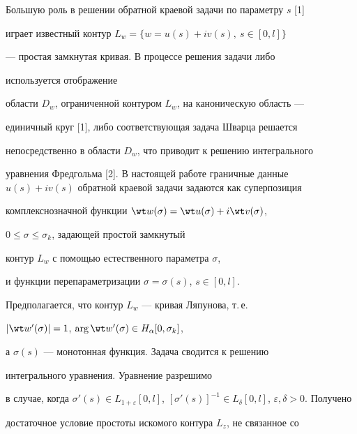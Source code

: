 

\maketitle


\label{begin}











Большую роль в решении обратной краевой задачи по параметру $s$ [1]


играет известный контур $L_w = \{w = u(s) + i v(s),\ s \in [0,l]\}$


--- простая замкнутая кривая. В процессе решения задачи либо


используется отображение


области $D_w$, ограниченной контуром $L_w$, на каноническую область ---


единичный круг [1], либо соответствующая задача Шварца решается


непосредственно в области $D_w$, что приводит к решению интегрального


уравнения Фредгольма [2]. В настоящей работе граничные данные $u(s) +


i v(s)$ обратной краевой задачи задаются как суперпозиция


комплекснозначной функции $\wt w(\sigma) = \wt u(\sigma) + i \wt v(\sigma)$,


$0 \leq \sigma \leq \sigma_k$, задающей простой замкнутый


контур $L_w$ с помощью естественного параметра $\sigma$,


и функции перепараметризации $\sigma = \sigma(s)$, $s \in [0,l]$.


Предполагается, что контур $L_w$ --- кривая Ляпунова, т.\,е.


$|\wt w'(\sigma)| = 1$, $\arg \wt w'(\sigma) \in H_{\alpha}[0,\sigma_k]$,


а $\sigma(s)$ --- монотонная функция. Задача сводится к решению


интегрального уравнения. Уравнение разрешимо


в случае, когда $\sigma'(s) \in L_{1+\varepsilon}[0,l]$, $[\sigma'(s)]^{-1}


\in L_{\delta}[0,l]$, $\varepsilon, \delta > 0$. Получено


достаточное условие простоты искомого контура $L_z$, не связанное со


